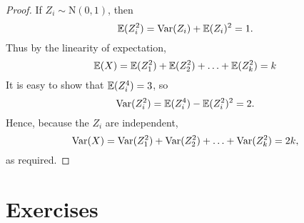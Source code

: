 \begin{proof}
\hideoff
If $Z_i\sim\text{N}(0,1)$, then 
\[
\mathbb{E}(Z_i^2) = \text{Var}(Z_i)+\mathbb{E}(Z_i)^2 = 1.
\]
Thus by the linearity of expectation,
\[
\mathbb{E}(X) = \mathbb{E}(Z^2_1)+\mathbb{E}(Z^2_2)+\ldots+\mathbb{E}(Z^2_k) = k
\]
It is easy to show that $\mathbb{E}(Z_i^4)=3$, so 
\[
\text{Var}(Z_i^2) = \mathbb{E}(Z_i^4)-\mathbb{E}(Z_i^2)^2 = 2.
\]
Hence, because the $Z_i$ are independent,
\[
\text{Var}(X) = \text{Var}(Z^2_1)+\text{Var}(Z^2_2)+\ldots+\text{Var}(Z^2_k) = 2k,
\]
as required.
\hideon
\end{proof}


\newpage
\section{Exercises}


\endinput
